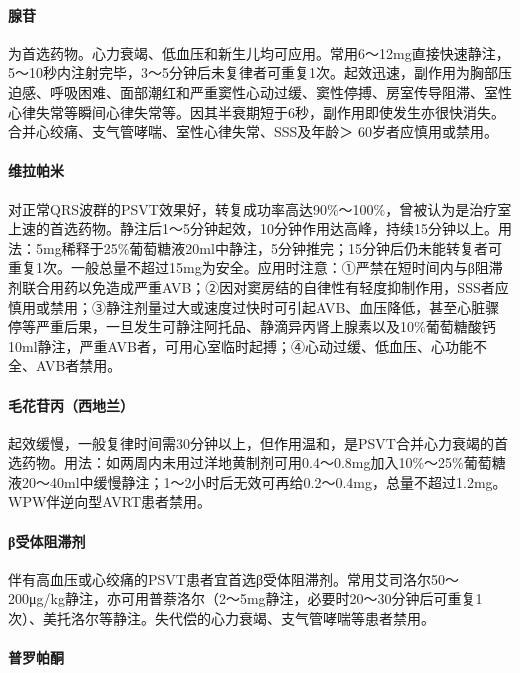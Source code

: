 \paragraph{腺苷}

为首选药物。心力衰竭、低血压和新生儿均可应用。常用6～12mg直接快速静注，5～10秒内注射完毕，3～5分钟后未复律者可重复1次。起效迅速，副作用为胸部压迫感、呼吸困难、面部潮红和严重窦性心动过缓、窦性停搏、房室传导阻滞、室性心律失常等瞬间心律失常等。因其半衰期短于6秒，副作用即使发生亦很快消失。合并心绞痛、支气管哮喘、室性心律失常、SSS及年龄＞
60岁者应慎用或禁用。

\paragraph{维拉帕米}

对正常QRS波群的PSVT效果好，转复成功率高达90\%～100\%，曾被认为是治疗室上速的首选药物。静注后1～5分钟起效，10分钟作用达高峰，持续15分钟以上。用法：5mg稀释于25\%葡萄糖液20ml中静注，5分钟推完；15分钟后仍未能转复者可重复1次。一般总量不超过15mg为安全。应用时注意：①严禁在短时间内与β阻滞剂联合用药以免造成严重AVB；②因对窦房结的自律性有轻度抑制作用，SSS者应慎用或禁用；③静注剂量过大或速度过快时可引起AVB、血压降低，甚至心脏骤停等严重后果，一旦发生可静注阿托品、静滴异丙肾上腺素以及10\%葡萄糖酸钙10ml静注，严重AVB者，可用心室临时起搏；④心动过缓、低血压、心功能不全、AVB者禁用。

\paragraph{毛花苷丙（西地兰）}

起效缓慢，一般复律时间需30分钟以上，但作用温和，是PSVT合并心力衰竭的首选药物。用法：如两周内未用过洋地黄制剂可用0.4～0.8mg加入10\%～25\%葡萄糖液20～40ml中缓慢静注；1～2小时后无效可再给0.2～0.4mg，总量不超过1.2mg。WPW伴逆向型AVRT患者禁用。

\paragraph{β受体阻滞剂}

伴有高血压或心绞痛的PSVT患者宜首选β受体阻滞剂。常用艾司洛尔50～200μg/kg静注，亦可用普萘洛尔（2～5mg静注，必要时20～30分钟后可重复1次）、美托洛尔等静注。失代偿的心力衰竭、支气管哮喘等患者禁用。

\paragraph{普罗帕酮}

